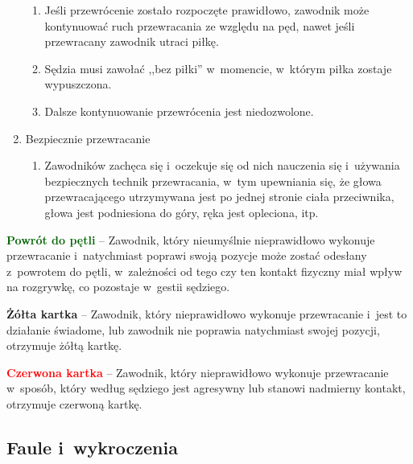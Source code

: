 \documentclass[12pt,a4paper]{article}
\renewcommand{\subsubsection}[1]{
  \oldsubsubsection{#1}%
  \leftskip1.5cm
}
\newcommand\redcard[1]{\bgroup\textcolor{red}{\textbf{#1}}}
\newcommand\yellowcard[1]{\bgroup\textcolor{darkyellow}{\textbf{#1}}}
\newcommand\other[1]{\bgroup\textcolor{darkgreen}{\textbf{#1}}}
\begin{document}
\begin{enumerate}
	      \begin{enumerate}
		      \item
		            Jeśli przewrócenie zostało rozpoczęte prawidłowo, zawodnik może
		            kontynuować ruch przewracania ze względu na pęd, nawet jeśli
		            przewracany zawodnik utraci piłkę.
		      \item
		            Sędzia musi zawołać ,,bez piłki'' w~momencie, w~którym piłka
		            zostaje wypuszczona.
		      \item
		            Dalsze kontynuowanie przewrócenia jest niedozwolone.
	      \end{enumerate}
	\item
	      Bezpiecznie przewracanie

	      \begin{enumerate}
		      \item
		            Zawodników zachęca się i~oczekuje się od nich nauczenia się i~używania bezpiecznych technik przewracania, w~tym upewniania się, że
		            głowa przewracającego utrzymywana jest po jednej stronie ciała przeciwnika,
		            głowa jest podniesiona do góry, ręka jest opleciona, itp.
	      \end{enumerate}
\end{enumerate}

\other{Powrót do pętli} -- Zawodnik, który nieumyślnie nieprawidłowo
wykonuje przewracanie i~natychmiast poprawi swoją pozycje może zostać
odesłany z~powrotem do pętli, w~zależności od tego czy ten kontakt
fizyczny miał wpływ na rozgrywkę, co pozostaje w~gestii sędziego.

\yellowcard{Żółta kartka} -- Zawodnik, który nieprawidłowo wykonuje
przewracanie i~jest to działanie świadome, lub zawodnik nie poprawia
natychmiast swojej pozycji, otrzymuje żółtą kartkę.

\redcard{Czerwona kartka} -- Zawodnik, który nieprawidłowo wykonuje
przewracanie w~sposób, który według sędziego jest agresywny lub stanowi
nadmierny kontakt, otrzymuje czerwoną kartkę.

\subsection{Faule i~wykroczenia}

\subsubsection{Kary dyscyplinarne}
\end{document}
